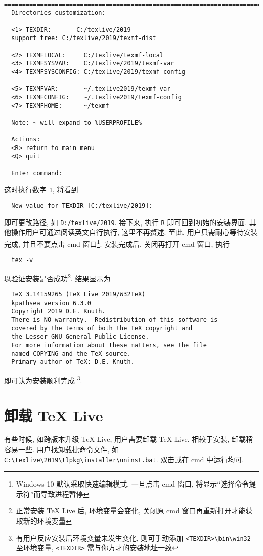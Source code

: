 \documentclass{ctexrep}
\begin{document}
\begin{lstlisting}
  ==============================================================================
  Directories customization:
  
  <1> TEXDIR:       C:/texlive/2019
  support tree: C:/texlive/2019/texmf-dist
  
  <2> TEXMFLOCAL:     C:/texlive/texmf-local
  <3> TEXMFSYSVAR:    C:/texlive/2019/texmf-var
  <4> TEXMFSYSCONFIG: C:/texlive/2019/texmf-config
  
  <5> TEXMFVAR:       ~/.texlive2019/texmf-var
  <6> TEXMFCONFIG:    ~/.texlive2019/texmf-config
  <7> TEXMFHOME:      ~/texmf
  
  Note: ~ will expand to %USERPROFILE%
  
  Actions:
  <R> return to main menu
  <Q> quit
  
  Enter command:
\end{lstlisting}
这时执行数字 \texttt{1}, 将看到
\begin{lstlisting}
  New value for TEXDIR [C:/texlive/2019]:
\end{lstlisting}
即可更改路径, 如 \texttt{D:/texlive/2019}. 
接下来, 执行 \texttt{R} 即可回到初始的安装界面. 
其他操作用户可通过阅读英文自行执行, 这里不再赘述. 
至此, 用户只需耐心等待安装完成, 并且不要点击 \textsf{cmd} 窗口\footnote{Windows 10 默认采取快速编辑模式, 一旦点击 \textsf{cmd} 窗口, 将显示``选择命令提示符''而导致进程暂停}. 
安装完成后, 关闭再打开 \textsf{cmd} 窗口, 执行
\begin{lstlisting}
  tex -v
\end{lstlisting}
以验证安装是否成功\footnote{正常安装 \TeX{} Live 后, 环境变量会变化, 关闭原 \textsf{cmd} 窗口再重新打开才能获取新的环境变量}. 
结果显示为
\begin{lstlisting}
  TeX 3.14159265 (TeX Live 2019/W32TeX)
  kpathsea version 6.3.0
  Copyright 2019 D.E. Knuth.
  There is NO warranty.  Redistribution of this software is
  covered by the terms of both the TeX copyright and
  the Lesser GNU General Public License.
  For more information about these matters, see the file
  named COPYING and the TeX source.
  Primary author of TeX: D.E. Knuth.
\end{lstlisting}
即可认为安装顺利完成 \footnote{有用户反应安装后环境变量未发生变化, 则可手动添加 \texttt{<TEXDIR>\textbackslash bin\textbackslash win32} 至环境变量, \texttt{<TEXDIR>} 需与你方才的安装地址一致}. 

\section{卸载 \TeX{} Live}
有些时候, 如跨版本升级 \TeX{} Live,  用户需要卸载 \TeX{} Live. 
相较于安装, 卸载稍容易一些. 
用户找卸载批命令文件, 如 \texttt{C:\textbackslash texlive\textbackslash 2019\textbackslash tlpkg\textbackslash installer\textbackslash uninst.bat}. 
双击或在 \textsf{cmd} 中运行均可. 
\end{document}
